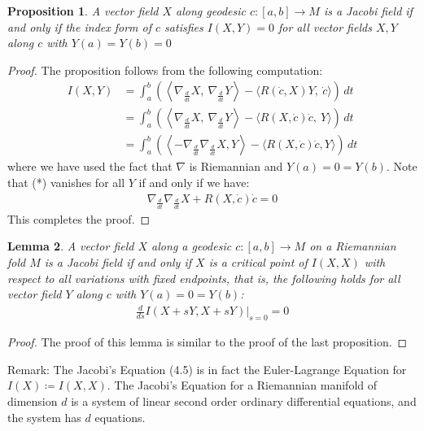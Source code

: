 \documentclass[11pt]{book}
\theoremstyle{break}
\theoremstyle{break}
\newtheorem{lem}{Lemma}[thm]
\newtheorem{prop}[lem]{Proposition}
\newcommand{\remark}{\color{blue}Remark: \color{black}}
\begin{document}
\begin{prop}
A vector field $X$ along geodesic $c:[a,b] \to M$ is a Jacobi field if and only if the index form of $c$ satisfies $I(X,Y) = 0$ for all vector fields $X,Y$ along $c$ with $Y(a) = Y(b) = 0$
\end{prop}
\begin{proof}
The proposition follows from the following computation:
\begin{align*}
I(X,Y) &= \int_a^b  \left( \left\langle \nabla_{\frac{d}{dt}}X,\ \nabla_{\frac{d}{dt}}Y \right\rangle - \langle R(\dot{c},X)Y,\ \dot{c}\rangle\right) \, dt
\\
&= \int_a^b  \left( \left\langle \nabla_{\frac{d}{dt}}X,\ \nabla_{\frac{d}{dt}}Y \right\rangle - \langle R(X, \dot{c})\dot{c},\ Y\rangle\right) \, dt \\
&= \int_a^b \left( \left\langle -\nabla_{\frac{d}{dt}} \nabla_{\frac{d}{dt}}X, Y \right\rangle - \langle R(X,\dot{c})\dot{c}, Y\rangle\right)\, dt \tag{*}
\end{align*}
where we have used the fact that $\nabla$ is Riemannian and $Y(a) = 0 = Y(b)$. Note that (*) vanishes for all $Y$ if and only if we have:
\begin{align*}
\nabla_{\frac{d}{dt}}\nabla_{\frac{d}{dt}}X + R(X,\dot{c})\dot{c} = 0
\end{align*}
This completes the proof. 
\end{proof}

\begin{lem}
A vector field $X$ along a geodesic $c:[a,b] \to M$ on a Riemannian fold $M$ is a Jacobi field if and only if $X$ is a critical point of $I(X,X)$ with respect to all variations with fixed endpoints, that is, the following holds for all vector field $Y$ along $c$ with $Y(a) = 0 = Y(b)$:
\begin{align*}
\frac{d}{ds}\left.I(X+sY,X+sY)\right|_{s=0} = 0
\end{align*}
\end{lem}
\begin{proof}
The proof of this lemma is similar to the proof of the last proposition. 
\end{proof}

\remark The Jacobi's Equation (4.5) is in fact the Euler-Lagrange Equation for $I(X) \coloneqq I(X,X)$. The Jacobi's Equation for a Riemannian manifold of dimension $d$ is a system of linear second order ordinary differential equations, and the system has $d$ equations. \\
\end{document}
